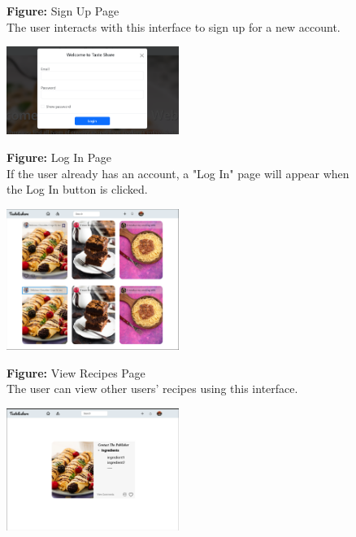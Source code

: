 \documentclass{article}
\begin{document}
{{{\begin{figure}[htbp]
    \textbf{Figure:} Sign Up Page \\
    The user interacts with this interface to sign up for a new account.
\end{figure}

\begin{figure}[htbp]
    \centering
    \includegraphics[width=0.5\textwidth]{LogIn} 
    \vspace{0.5cm}
    
    \textbf{Figure:} Log In Page \\
    If the user already has an account, a "Log In" page will appear when the Log In button is clicked.
\end{figure}

\begin{figure}[htbp]
    \centering
    \includegraphics[width=0.5\textwidth]{ViewRecipes} 
    \vspace{0.5cm}
    
    \textbf{Figure:} View Recipes Page \\
    The user can view other users' recipes using this interface.
\end{figure}

\begin{figure}[htbp]
    \centering
    \includegraphics[width=0.5\textwidth]{ViewRecipes2} 
    \vspace{0.5cm}
    

\end{figure}}}}
\end{document}
